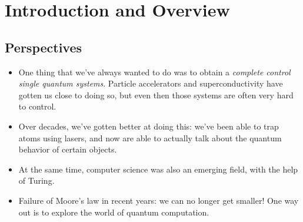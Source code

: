 \chapter{Introduction and Overview}

\section{Perspectives}
\begin{itemize}
	\item One thing that we've always wanted to do was to obtain a \textit{complete control single 
		quantum systems}. Particle accelerators and superconductivity have gotten us close to doing so, but 
		even then those systems are often very hard to control. 
	\item Over decades, we've gotten better at doing this: we've been able to trap atoms 
		using lasers, and now are able to actually talk about the quantum behavior of certain objects.
	\item At the same time, computer science was also an emerging field, with the help of Turing. 
	\item Failure of Moore's law in recent years: we can no longer get smaller! One way out 
		is to explore the world of quantum computation.  
\end{itemize}
